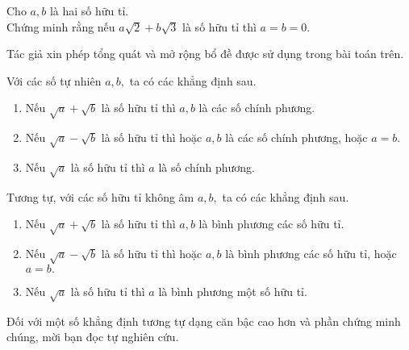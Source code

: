 \begin{bx} 
Cho $a,b$ là hai số hữu tỉ. \\Chứng minh rằng nếu $a\sqrt{2}+b\sqrt{3}$ là số hữu tỉ thì $a=b=0.$

\begin{it}
Tác giả xin phép tổng quát và mở rộng bổ đề được sử dụng trong bài toán trên.
\end{it}

\begin{light}
Với các số tự nhiên $a,b,$ ta có các khẳng định sau.
\begin{enumerate}
    \item Nếu $\sqrt{a}+\sqrt{b}$ là số hữu tỉ thì $a,b$ là các số chính phương.
    \item Nếu $\sqrt{a}-\sqrt{b}$ là số hữu tỉ thì hoặc $a,b$ là các số chính phương, hoặc $a=b.$
    \item Nếu $\sqrt{a}$ là số hữu tỉ thì $a$ là số chính phương.  
\end{enumerate}    
Tương tự, với các số hữu tỉ không âm $a,b,$ ta có các khẳng định sau.
\begin{enumerate}
    \item Nếu $\sqrt{a}+\sqrt{b}$ là số hữu tỉ thì $a,b$ là bình phương các số hữu tỉ.
    \item Nếu $\sqrt{a}-\sqrt{b}$ là số hữu tỉ thì hoặc $a,b$ là bình phương các số hữu tỉ, hoặc $a=b.$
    \item Nếu $\sqrt{a}$ là số hữu tỉ thì $a$ là bình phương một số hữu tỉ.     \end{enumerate}
\end{light}
\end{bx} %

\begin{it}
Đối với một số khẳng định tương tự dạng căn bậc cao hơn và phần chứng minh chúng, mời bạn đọc tự nghiên cứu.
\end{it}

